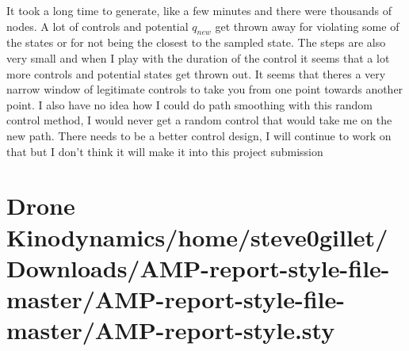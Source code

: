 \documentclass{article}
\begin{document}
It took a long time to generate, like a few minutes and there were thousands of nodes.
A lot of controls and potential $q_{new}$ get thrown away for violating some of the states or for not being the closest to the sampled state.
The steps are also very small and when I play with the duration of the control it seems that a lot more controls and potential states get thrown out.
It seems that theres a very narrow window of legitimate controls to take you from one point towards another point.
I also have no idea how I could do path smoothing with this random control method, I would never get a random control that would take me on the new path.
There needs to be a better control design, I will continue to work on that but I don't think it will make it into this project submission


\section*{Drone Kinodynamics/home/steve0gillet/Downloads/AMP-report-style-file-master/AMP-report-style-file-master/AMP-report-style.sty}
\end{document}
